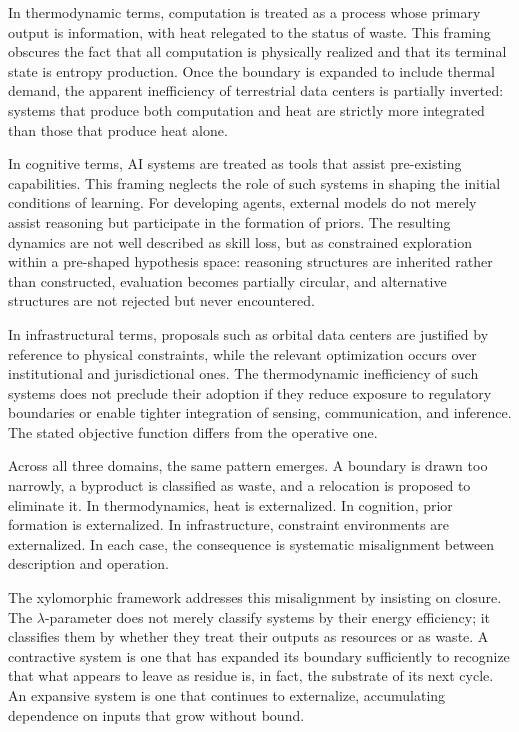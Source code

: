 \documentclass[11pt,a4paper]{article}
\theoremstyle{plain}
\theoremstyle{definition}
\theoremstyle{remark}
\begin{document}
In thermodynamic terms, computation is treated as a process whose primary output
is information, with heat relegated to the status of waste. This framing obscures
the fact that all computation is physically realized and that its terminal state
is entropy production. Once the boundary is expanded to include thermal demand,
the apparent inefficiency of terrestrial data centers is partially inverted:
systems that produce both computation and heat are strictly more integrated than
those that produce heat alone.

In cognitive terms, AI systems are treated as tools that assist pre-existing
capabilities. This framing neglects the role of such systems in shaping the
initial conditions of learning. For developing agents, external models do not
merely assist reasoning but participate in the formation of priors. The resulting
dynamics are not well described as skill loss, but as constrained exploration
within a pre-shaped hypothesis space: reasoning structures are inherited rather
than constructed, evaluation becomes partially circular, and alternative
structures are not rejected but never encountered.

In infrastructural terms, proposals such as orbital data centers are justified by
reference to physical constraints, while the relevant optimization occurs over
institutional and jurisdictional ones. The thermodynamic inefficiency of such
systems does not preclude their adoption if they reduce exposure to regulatory
boundaries or enable tighter integration of sensing, communication, and
inference. The stated objective function differs from the operative one.

Across all three domains, the same pattern emerges. A boundary is drawn too
narrowly, a byproduct is classified as waste, and a relocation is proposed to
eliminate it. In thermodynamics, heat is externalized. In cognition, prior
formation is externalized. In infrastructure, constraint environments are
externalized. In each case, the consequence is systematic misalignment between
description and operation.

The xylomorphic framework addresses this misalignment by insisting on closure.
The $\lambda$-parameter does not merely classify systems by their energy
efficiency; it classifies them by whether they treat their outputs as resources
or as waste. A contractive system is one that has expanded its boundary
sufficiently to recognize that what appears to leave as residue is, in fact, the
substrate of its next cycle. An expansive system is one that continues to
externalize, accumulating dependence on inputs that grow without bound.
\end{document}
